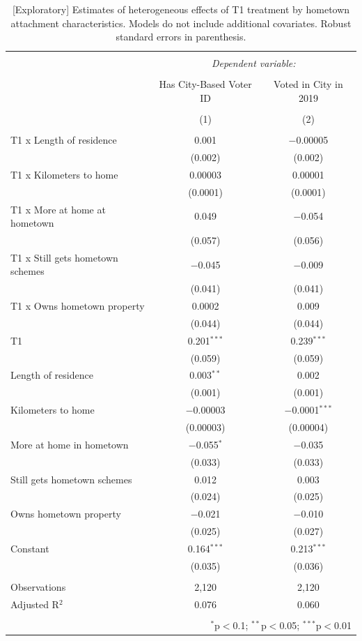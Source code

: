 \documentclass[
  11.5pt,
]{article}
\begin{document}
\begin{table}[!htbp] \centering 
  \caption{[Exploratory] Estimates of heterogeneous effects of T1 treatment by hometown attachment characteristics. Models do not include additional covariates. Robust standard errors in parenthesis.} 
  \label{tab:t1_interaction_village} 
\small 
\begin{tabular}{@{\extracolsep{5pt}}lcc} 
\\[-1.8ex]\hline 
\hline \\[-1.8ex] 
 & \multicolumn{2}{c}{\textit{Dependent variable:}} \\ 
\cline{2-3} 
\\[-1.8ex] & Has City-Based Voter ID & Voted in City in 2019 \\ 
\\[-1.8ex] & (1) & (2)\\ 
\hline \\[-1.8ex] 
 T1 x Length of residence & 0.001 & $-$0.00005 \\ 
  & (0.002) & (0.002) \\ 
  T1 x Kilometers to home & 0.00003 & 0.00001 \\ 
  & (0.0001) & (0.0001) \\ 
  T1 x More at home at hometown & 0.049 & $-$0.054 \\ 
  & (0.057) & (0.056) \\ 
  T1 x Still gets hometown schemes & $-$0.045 & $-$0.009 \\ 
  & (0.041) & (0.041) \\ 
  T1 x Owns hometown property & 0.0002 & 0.009 \\ 
  & (0.044) & (0.044) \\ 
  T1 & 0.201$^{***}$ & 0.239$^{***}$ \\ 
  & (0.059) & (0.059) \\ 
  Length of residence & 0.003$^{**}$ & 0.002 \\ 
  & (0.001) & (0.001) \\ 
  Kilometers to home & $-$0.00003 & $-$0.0001$^{***}$ \\ 
  & (0.00003) & (0.00004) \\ 
  More at home in hometown & $-$0.055$^{*}$ & $-$0.035 \\ 
  & (0.033) & (0.033) \\ 
  Still gets hometown schemes & 0.012 & 0.003 \\ 
  & (0.024) & (0.025) \\ 
  Owns hometown property & $-$0.021 & $-$0.010 \\ 
  & (0.025) & (0.027) \\ 
  Constant & 0.164$^{***}$ & 0.213$^{***}$ \\ 
  & (0.035) & (0.036) \\ 
 \hline \\[-1.8ex] 
Observations & 2,120 & 2,120 \\ 
Adjusted R$^{2}$ & 0.076 & 0.060 \\ 
\hline 
\hline \\[-1.8ex] 
\multicolumn{3}{r}{$^{*}$p$<$0.1; $^{**}$p$<$0.05; $^{***}$p$<$0.01} \\ 
\end{tabular} 
\end{table}
\end{document}
